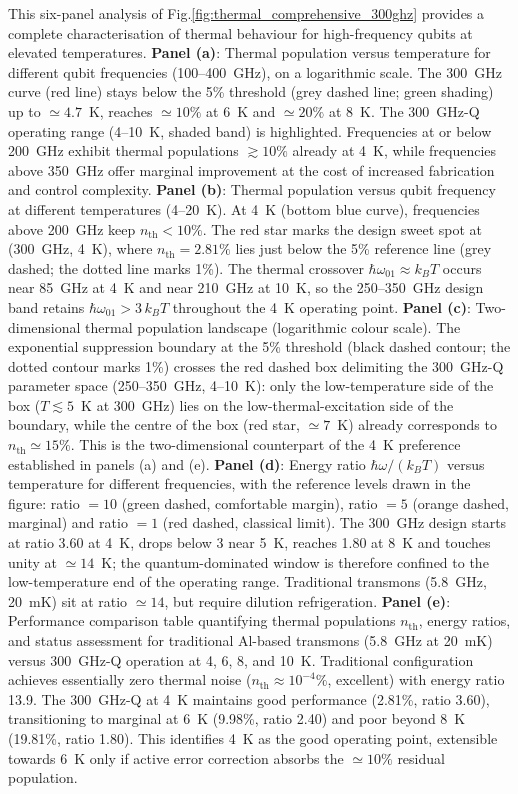 This six-panel analysis of Fig.\ref{fig:thermal_comprehensive_300ghz} provides a complete characterisation of thermal behaviour for high-frequency qubits at elevated temperatures. 
\textbf{Panel (a)}: Thermal population versus temperature for different qubit frequencies (100--400~GHz), on a logarithmic scale. The 300~GHz curve (red line) stays below the 5\% threshold (grey dashed line; green shading) up to $\simeq 4.7$~K, reaches $\simeq 10\%$ at 6~K and $\simeq 20\%$ at 8~K. The 300~GHz-Q operating range (4--10~K, shaded band) is highlighted. Frequencies at or below 200~GHz exhibit thermal populations $\gtrsim 10\%$ already at 4~K, while frequencies above 350~GHz offer marginal improvement at the cost of increased fabrication and control complexity.
\textbf{Panel (b)}: Thermal population versus qubit frequency at different temperatures (4--20~K). At 4~K (bottom blue curve), frequencies above 200~GHz keep $n_{\text{th}} < 10\%$. The red star marks the design sweet spot at (300~GHz, 4~K), where $n_{\text{th}} = 2.81\%$ lies just below the 5\% reference line (grey dashed; the dotted line marks 1\%). The thermal crossover $\hbar\omega_{01} \approx k_B T$ occurs near 85~GHz at 4~K and near 210~GHz at 10~K, so the 250--350~GHz design band retains $\hbar\omega_{01} > 3\,k_B T$ throughout the 4~K operating point.
\textbf{Panel (c)}: Two-dimensional thermal population landscape (logarithmic colour scale). The exponential suppression boundary at the 5\% threshold (black dashed contour; the dotted contour marks 1\%) crosses the red dashed box delimiting the 300~GHz-Q parameter space (250--350~GHz, 4--10~K): only the low-temperature side of the box ($T \lesssim 5$~K at 300~GHz) lies on the low-thermal-excitation side of the boundary, while the centre of the box (red star, $\simeq 7$~K) already corresponds to $n_{\text{th}} \simeq 15\%$. This is the two-dimensional counterpart of the 4~K preference established in panels (a) and (e).
\textbf{Panel (d)}: Energy ratio $\hbar\omega/(k_B T)$ versus temperature for different frequencies, with the reference levels drawn in the figure: ratio $=10$ (green dashed, comfortable margin), ratio $=5$ (orange dashed, marginal) and ratio $=1$ (red dashed, classical limit). The 300~GHz design starts at ratio 3.60 at 4~K, drops below 3 near 5~K, reaches 1.80 at 8~K and touches unity at $\simeq 14$~K; the quantum-dominated window is therefore confined to the low-temperature end of the operating range. Traditional transmons (5.8~GHz, 20~mK) sit at ratio $\simeq 14$, but require dilution refrigeration.
\textbf{Panel (e)}: Performance comparison table quantifying thermal populations $n_{\text{th}}$, energy ratios, and status assessment for traditional Al-based transmons (5.8~GHz at 20~mK) versus 300~GHz-Q operation at 4, 6, 8, and 10~K. Traditional configuration achieves essentially zero thermal noise ($n_{\text{th}} \approx 10^{-4}\%$, excellent) with energy ratio 13.9. The 300~GHz-Q at 4~K maintains good performance (2.81\%, ratio 3.60), transitioning to marginal at 6~K (9.98\%, ratio 2.40) and poor beyond 8~K (19.81\%, ratio 1.80). This identifies 4~K as the good operating point, extensible towards 6~K only if active error correction absorbs the $\simeq 10\%$ residual population.

